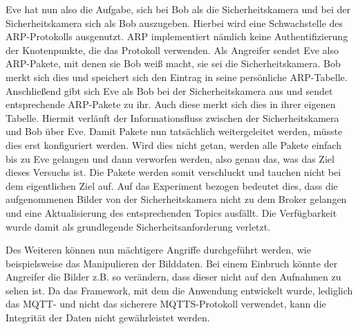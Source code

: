 Eve hat nun also die Aufgabe, sich bei Bob als die Sicherheitskamera und bei der
Sicherheitskamera sich als Bob auszugeben. Hierbei wird eine Schwachstelle des
ARP-Protokolls ausgenutzt. ARP implementiert nämlich keine Authentifizierung der
Knotenpunkte, die das Protokoll verwenden. Als Angreifer sendet Eve also
ARP-Pakete, mit denen sie Bob weiß macht, sie sei die Sicherheitskamera. Bob
merkt sich dies und speichert sich den Eintrag in seine persönliche ARP-Tabelle.
Anschließend gibt sich Eve als Bob bei der Sicherheitskamera aus und sendet
entsprechende ARP-Pakete zu ihr. Auch diese merkt sich dies in ihrer eigenen
Tabelle. Hiermit verläuft der Informationsfluss zwischen der Sicherheitskamera
und Bob über Eve. Damit Pakete nun tatsächlich weitergeleitet werden, müsste
dies erst konfiguriert werden. Wird dies nicht getan, werden alle Pakete
einfach bis zu Eve gelangen und dann verworfen werden, also genau das, was das
Ziel dieses Versuchs ist. Die Pakete werden somit verschluckt und tauchen nicht
bei dem eigentlichen Ziel auf. Auf das Experiment bezogen bedeutet dies, dass
die aufgenommenen Bilder von der Sicherheitskamera nicht zu dem Broker gelangen
und eine Aktualisierung des entsprechenden Topics ausfällt. Die Verfügbarkeit
wurde damit als grundlegende Sicherheitsanforderung verletzt.

Des Weiteren können nun mächtigere Angriffe durchgeführt werden, wie
beispielsweise das Manipulieren der Bilddaten. Bei einem Einbruch könnte der
Angreifer die Bilder z.B. so verändern, dass dieser nicht auf den Aufnahmen zu
sehen ist. Da das Framework, mit dem die Anwendung entwickelt wurde, lediglich
das MQTT- und nicht das sicherere MQTTS-Protokoll verwendet, kann die Integrität
der Daten nicht gewährleistet werden.
